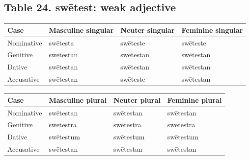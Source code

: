 \subsection*{Table 24. swētest: weak adjective}

\par\begingroup
\fontsize{10.5}{13.2}\selectfont
\setlength{\LTleft}{0pt}\setlength{\LTright}{\fill}
\noindent
\begin{tabular}{@{}>{\raggedright\arraybackslash}p{22.0mm}>{\raggedright\arraybackslash}p{31.188mm}>{\raggedright\arraybackslash}p{31.188mm}>{\raggedright\arraybackslash}p{31.188mm}@{}}
\toprule
\textbf{Case} & \textbf{Masculine singular} & \textbf{Neuter singular} & \textbf{Feminine singular} \\
\midrule
Nominative & swētesta & swēteste & swēteste \\
Genitive & swētestan & swētestan & swētestan \\
Dative & swētestan & swētestan & swētestan \\
Accusative & swētestan & swēteste & swētestan \\
\bottomrule
\end{tabular}
\par\endgroup
\par\addvspace{5pt}
\par\begingroup
\fontsize{10.5}{13.2}\selectfont
\setlength{\LTleft}{0pt}\setlength{\LTright}{\fill}
\noindent
\begin{tabular}{@{}>{\raggedright\arraybackslash}p{22.0mm}>{\raggedright\arraybackslash}p{31.188mm}>{\raggedright\arraybackslash}p{31.188mm}>{\raggedright\arraybackslash}p{31.188mm}@{}}
\toprule
\textbf{Case} & \textbf{Masculine plural} & \textbf{Neuter plural} & \textbf{Feminine plural} \\
\midrule
Nominative & swētestan & swētestan & swētestan \\
Genitive & swētestra & swētestra & swētestra \\
Dative & swētestum & swētestum & swētestum \\
Accusative & swētestan & swētestan & swētestan \\
\bottomrule
\end{tabular}
\par\endgroup

